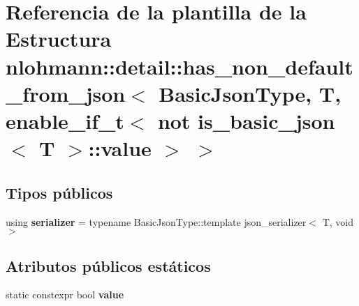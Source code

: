 \hypertarget{structnlohmann_1_1detail_1_1has__non__default__from__json_3_01BasicJsonType_00_01T_00_01enable__a9e4562f31f7ed523e6e0f675606b0f2}{}\section{Referencia de la plantilla de la Estructura nlohmann\+:\+:detail\+:\+:has\+\_\+non\+\_\+default\+\_\+from\+\_\+json$<$ Basic\+Json\+Type, T, enable\+\_\+if\+\_\+t$<$ not is\+\_\+basic\+\_\+json$<$ T $>$\+:\+:value $>$ $>$}
\label{structnlohmann_1_1detail_1_1has__non__default__from__json_3_01BasicJsonType_00_01T_00_01enable__a9e4562f31f7ed523e6e0f675606b0f2}
\subsection*{Tipos públicos}
\begin{DoxyCompactItemize}
\item 
\mbox{\label{structnlohmann_1_1detail_1_1has__non__default__from__json_3_01BasicJsonType_00_01T_00_01enable__a9e4562f31f7ed523e6e0f675606b0f2_a610272ed924122e0c46d158ecdfe6faf}} 
using {\bfseries serializer} = typename Basic\+Json\+Type\+::template json\+\_\+serializer$<$ T, void $>$
\end{DoxyCompactItemize}
\subsection*{Atributos públicos estáticos}
\begin{DoxyCompactItemize}
\item 
static constexpr bool {\bfseries value}
\end{DoxyCompactItemize}


